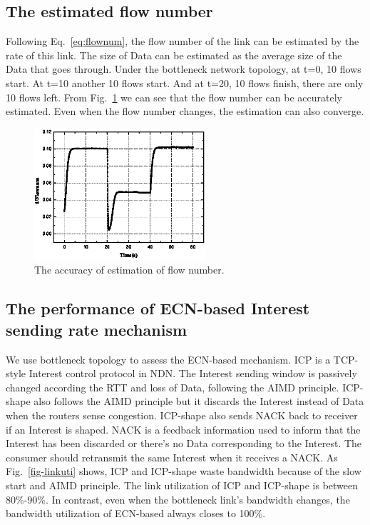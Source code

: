 \subsection{The estimated flow number}

 Following Eq.~\ref{eq:flownum}, the flow number of the link can be estimated by the rate of this link. The size of Data can be estimated as the average size of the Data that goes through. Under the bottleneck network topology, at t=0, 10 flows start. At t=10 another 10 flows start. And at t=20, 10 flows finish, there are only 10 flows left. From Fig.~\ref{fig-flownum} we can see that the flow number can be accurately estimated. Even when the flow number changes, the estimation can also converge.

\begin{figure}[t]
\centering
\includegraphics[width=2.5in]{flownum-pic-cut.eps}
\caption{The accuracy of estimation of flow number.}
\label{fig-flownum}
\end{figure}

\subsection{The performance of ECN-based Interest sending rate mechanism}

We use bottleneck topology to assess the ECN-based mechanism. ICP is a TCP-style Interest control protocol in NDN. The Interest sending window is passively changed according the RTT and loss of Data, following the AIMD principle\cite{ICP}. ICP-shape also follows the AIMD principle but it discards the Interest instead of Data when the routers sense congestion\cite{improveshape}. ICP-shape also sends NACK back to receiver if an Interest is shaped. NACK is a feedback information used to inform that the Interest has been discarded or there's no Data corresponding to the Interest. The consumer should retransmit the same Interest when it receives a NACK. As Fig.~\ref{fig-linkuti} shows, ICP and ICP-shape waste bandwidth because of the slow start and AIMD principle. The link utilization of ICP and ICP-shape is between 80\%-90\%. In contrast, even when the bottleneck link's bandwidth changes, the bandwidth utilization of ECN-based always closes to 100\%.

